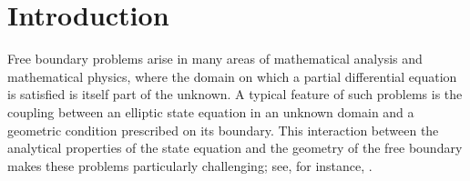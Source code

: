 \documentclass{article}
\begin{document}

\section{Introduction}
\label{sec:introduction}

Free boundary problems arise in many areas of mathematical analysis and
mathematical physics, where the domain on which a partial differential
equation is satisfied is itself part of the unknown. A typical feature
of such problems is the coupling between an elliptic state equation in
an unknown domain and a geometric condition prescribed on its boundary.
This interaction between the analytical properties of the state
equation and the geometry of the free boundary makes these problems
particularly challenging; see, for instance,
\cite{He,HP,sec}.
\end{document}
